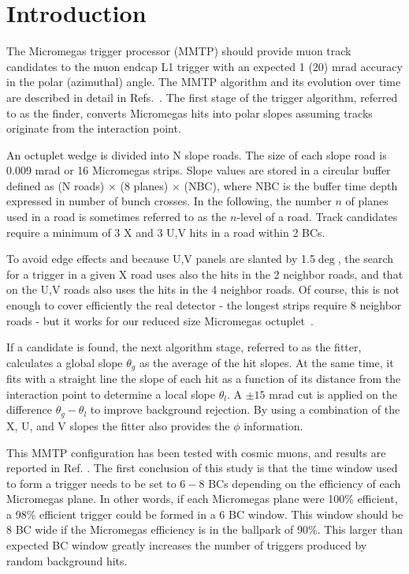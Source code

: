 \section{Introduction}
\label{sec:intro}

 The Micromegas trigger processor (MMTP) should provide muon track candidates to the muon endcap L1 trigger
 with an expected 1 (20) mrad accuracy in the polar (azimuthal) angle.
 The MMTP algorithm and its evolution over time are described in detail in Refs.~\cite{nswtdr,brian,steve}.
 The first stage of the trigger algorithm, referred to as the finder, 
 converts Micromegas hits into polar slopes assuming tracks originate from the interaction point.

 An octuplet wedge is divided into N slope roads. The size of each slope road is 0.009 mrad or 16 Micromegas
 strips. Slope values are stored in a circular buffer defined as (N roads) $\times$ (8 planes) $\times$  (NBC), where
 NBC is the buffer time depth expressed in number of bunch crosses. In the following, the number $n$ of  planes used in a road
 is sometimes referred to as the $n$-level of a road.
 Track candidates require a minimum of 3 X and 3 U,V hits in a road within 2 BCs. 

 To avoid edge effects and because U,V panels are slanted by 1.5$\deg$, the search
 for a trigger in a given X road uses also the hits in the 2 neighbor
 roads, and that on the U,V roads also uses the hits in the 4 neighbor roads.
 Of course, this is not enough to cover efficiently the real detector - the longest strips require 8 neighbor roads -
 but it works for our reduced size Micromegas
 octuplet~\cite{noisy,noiseless}.

 If a candidate is found, the next algorithm stage, referred to as the fitter, calculates a global slope $\theta_{g}$ as the
 average of the hit slopes. At the same time, it fits with a straight line the slope of each hit as a
 function of its distance from the interaction point
 to determine a local slope $\theta_l$.
 A $\pm 15$ mrad cut is applied on the difference $\theta_g-\theta_l$  to
 improve background rejection.
 By using a combination of the X, U, and V slopes the fitter also provides the $\phi$ information.
 
This MMTP configuration has been tested with cosmic muons, and results are reported in Ref. \cite{mmtp}.
 The first conclusion of this study is that the time window used to form a trigger needs to be set to $6 - 8$ BCs
depending on the efficiency of each Micromegas plane. In other words, if each Micromegas plane were 100\% efficient,
a 98\% efficient trigger could be formed in a 6 BC window. This window should be 8 BC wide if the
Micromegas efficiency is in the ballpark of 90\%. This larger than expected BC window greatly increases the number
of triggers produced by random background hits. 

